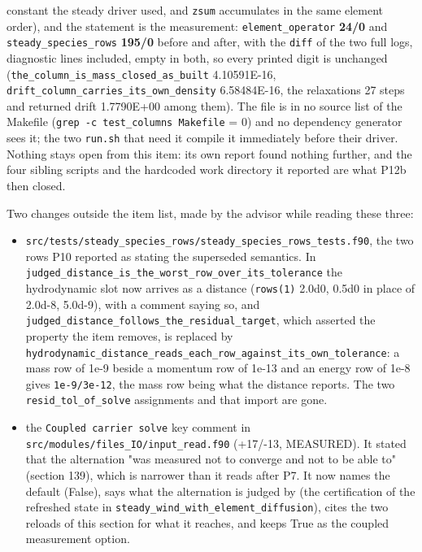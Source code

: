\documentclass[english,a4paper]{my_memo}
\providecommand{\tightlist}{\setlength{\itemsep}{0pt}\setlength{\parskip}{0pt}}
\begin{document}
\begin{itemize}
  constant the steady driver used, and \texttt{zsum} accumulates in the same element
  order), and the statement is the measurement: \texttt{element\_operator} \textbf{24/0}
  and \texttt{steady\_species\_rows} \textbf{195/0} before and after, with the \texttt{diff} of the
  two full logs, diagnostic lines included, empty in both, so every printed
  digit is unchanged (\texttt{the\_column\_is\_mass\_closed\_as\_built} 4.10591E-16,
  \texttt{drift\_column\_carries\_its\_own\_density} 6.58484E-16, the relaxation\textquotesingle s 27
  steps and returned drift 1.7790E+00 among them). The file is in no source
  list of the Makefile (\texttt{grep\ -c\ test\_columns\ Makefile} = 0) and no dependency
  generator sees it; the two \texttt{run.sh} that need it compile it immediately
  before their driver. Nothing stays open from this item: its own report
  found nothing further, and the four sibling scripts and the hardcoded work
  directory it reported are what P12b then closed.
\end{itemize}

Two changes outside the item list, made by the advisor while reading these
three:

\begin{itemize}
\tightlist
\item
  \texttt{src/tests/steady\_species\_rows/steady\_species\_rows\_tests.f90}, the two rows
  P10 reported as stating the superseded semantics. In
  \texttt{judged\_distance\_is\_the\_worst\_row\_over\_its\_tolerance} the hydrodynamic slot
  now arrives as a distance (\texttt{rows(1)} 2.0d0, 0.5d0 in place of 2.0d-8,
  5.0d-9), with a comment saying so, and
  \texttt{judged\_distance\_follows\_the\_residual\_target}, which asserted the property
  the item removes, is replaced by
  \texttt{hydrodynamic\_distance\_reads\_each\_row\_against\_its\_own\_tolerance}: a mass row
  of 1e-9 beside a momentum row of 1e-13 and an energy row of 1e-8 gives
  \texttt{1e-9/3e-12}, the mass row being what the distance reports. The two
  \texttt{resid\_tol\_of\_solve} assignments and that import are gone.
\item
  the \texttt{Coupled\ carrier\ solve} key comment in
  \texttt{src/modules/files\_IO/input\_read.f90} (+17/-13, MEASURED). It stated that
  the alternation "was measured not to converge and not to be able to"
  (section 139), which is narrower than it reads after P7. It now names the
  default (False), says what the alternation is judged by (the certification
  of the refreshed state in \texttt{steady\_wind\_with\_element\_diffusion}), cites the
  two reloads of this section for what it reaches, and keeps True as the
  coupled measurement option.
\end{itemize}
\end{document}
